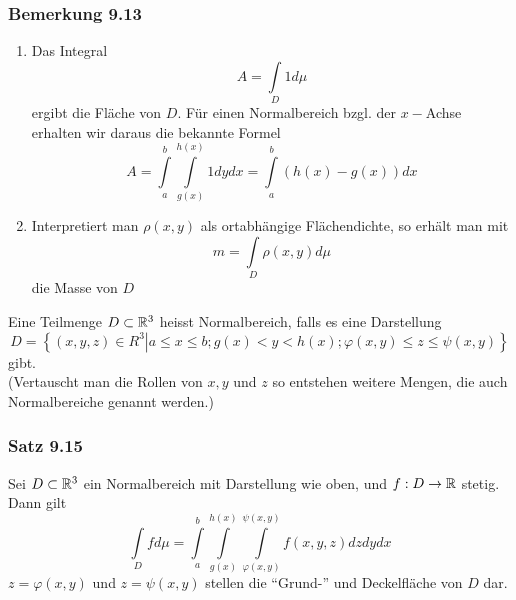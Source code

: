\subsubsection*{Bemerkung 9.13}
\begin{enumerate}
\item Das Integral \[A = \int\limits_D {1d\mu } \] ergibt die Fläche von $D$. Für einen Normalbereich bzgl. der $x-$Achse erhalten wir daraus die bekannte Formel
\[A = \int\limits_a^b {\int\limits_{g(x)}^{h(x)} {1dydx} }  = \int\limits_a^b {\left( {h(x) - g(x)} \right)dx} \]

\begin{center}
\end{center}

\item Interpretiert man $\rho(x,y)$ als ortabhängige Flächendichte, so erhält man mit \[m = \int\limits_D {\rho \left( {x,y} \right)d\mu } \] die Masse von $D$
\end{enumerate}

\begin{definition}{9.14}
Eine Teilmenge $D\subset\mathbb{R}^3$ heisst Normalbereich, falls es eine Darstellung
\[D = \left\{ {\left. {\left( {x,y,z} \right) \in {R^3}} \right|a \le x \le b;g(x) < y < h(x);\varphi \left( {x,y} \right) \le z \le \psi \left( {x,y} \right)} \right\}\] gibt.\\

(Vertauscht man die Rollen von $x,y$ und $z$ so entstehen weitere Mengen, die auch Normalbereiche genannt werden.)
\end{definition}

\subsubsection*{Satz 9.15}
Sei $D\subset\mathbb{R}^3$ ein Normalbereich mit Darstellung wie oben, und $f:D\to\mathbb{R}$ stetig. Dann gilt \[\int\limits_D {fd\mu }  = \int\limits_a^b {\int\limits_{g(x)}^{h(x)} {\int\limits_{\varphi \left( {x,y} \right)}^{\psi \left( {x,y} \right)} {f\left( {x,y,z} \right)dzdydx} } } \]
$z=\varphi \left( {x,y} \right)$ und $z=\psi \left( {x,y} \right)$ stellen die ``Grund-'' und Deckelfläche von $D$ dar. \\

